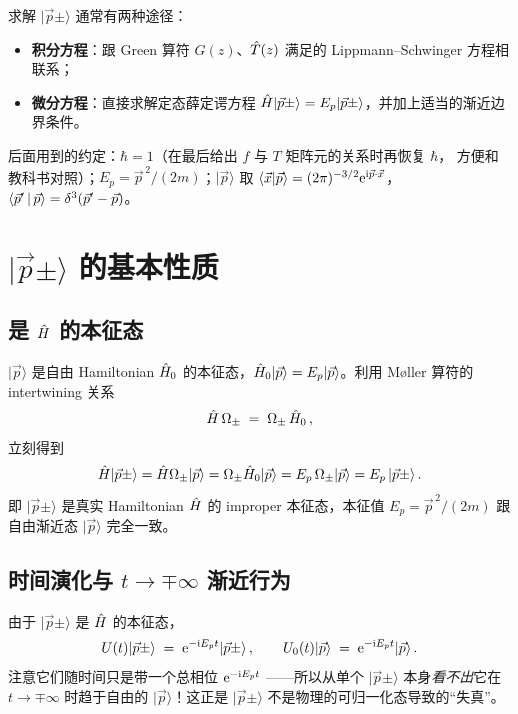 求解 $|\vec p\pm\rangle$ 通常有两种途径：
\begin{itemize}
  \item \textbf{积分方程}：跟 Green 算符 $G(z)$、$\hat{T}(z)$ 满足的 Lippmann--Schwinger
        方程相联系；
  \item \textbf{微分方程}：直接求解定态薛定谔方程 $\hat{H}|\vec p\pm\rangle =
        E_p|\vec p\pm\rangle$，并加上适当的渐近边界条件。
\end{itemize}

\begin{remark}
后面用到的约定：$\hbar=1$（在最后给出 $f$ 与 $T$ 矩阵元的关系时再恢复 $\hbar$，
方便和教科书对照）；$E_p = \vec p^{\,2}/(2m)$；$|\vec p\rangle$ 取
$\langle \vec x|\vec p\rangle = (2\pi)^{-3/2}\mathrm{e}^{\mathrm{i}\vec p\cdot\vec x}$，
$\left\langle \vec p' \,\middle|\, \vec p \right\rangle = \delta^3(\vec p'-\vec p)$。
\end{remark}

\section{$|\vec p\pm\rangle$ 的基本性质}

\subsection{是 $\hat{H}$ 的本征态}

$|\vec p\rangle$ 是自由 Hamiltonian $\hat{H}_0$ 的本征态，$\hat{H}_0|\vec p\rangle =
E_p|\vec p\rangle$。利用 M\o ller 算符的 intertwining 关系
\begin{equation}
  \hat{H}\,\Omega_\pm \;=\; \Omega_\pm\,\hat{H}_0\,,
  \label{eq:intertwining}
\end{equation}
立刻得到
\begin{equation}
  \hat{H}|\vec p\pm\rangle
  = \hat{H}\Omega_\pm|\vec p\rangle
  = \Omega_\pm \hat{H}_0|\vec p\rangle
  = E_p\,\Omega_\pm|\vec p\rangle
  = E_p\,|\vec p\pm\rangle\,.
  \label{eq:H-eigenppm}
\end{equation}
即 $|\vec p\pm\rangle$ 是真实 Hamiltonian $\hat{H}$ 的 improper 本征态，本征值
$E_p = \vec p^{\,2}/(2m)$ 跟自由渐近态 $|\vec p\rangle$ 完全一致。

\subsection{时间演化与 $t\to\mp\infty$ 渐近行为}

由于 $|\vec p\pm\rangle$ 是 $\hat{H}$ 的本征态，
\begin{equation}
  U(t)|\vec p\pm\rangle \;=\; \mathrm{e}^{-\mathrm{i} E_p t}|\vec p\pm\rangle\,,
  \qquad
  U_0(t)|\vec p\rangle \;=\; \mathrm{e}^{-\mathrm{i} E_p t}|\vec p\rangle\,.
\end{equation}
注意它们随时间只是带一个总相位 $\mathrm{e}^{-\mathrm{i} E_p t}$ ——所以从单个 $|\vec p\pm\rangle$
本身\emph{看不出}它在 $t\to\mp\infty$ 时趋于自由的 $|\vec p\rangle$！这正是
$|\vec p\pm\rangle$ 不是物理的可归一化态导致的``失真''。

